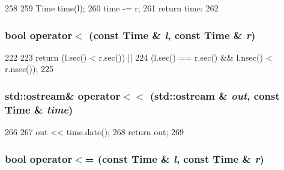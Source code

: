 \begin{DoxyCode}
258 {
259     Time time(l);
260     time -= r;
261     return time;
262 }
\end{DoxyCode}
\hypertarget{time_8hh_ad7758f80ee4f3845218fedfe23091532}{
\subsubsection[{operator$<$}]{\setlength{\rightskip}{0pt plus 5cm}bool operator$<$ (const {\bf Time} \& {\em l}, \/  const {\bf Time} \& {\em r})}}
\label{time_8hh_ad7758f80ee4f3845218fedfe23091532}



\begin{DoxyCode}
222 {
223     return (l.sec() < r.sec()) ||
224         (l.sec() == r.sec() && l.nsec() < r.nsec());
225 }
\end{DoxyCode}
\hypertarget{time_8hh_acd440d01c2aaa123d528091ba926ccd3}{
\subsubsection[{operator$<$$<$}]{\setlength{\rightskip}{0pt plus 5cm}std::ostream\& operator$<$$<$ (std::ostream \& {\em out}, \/  const {\bf Time} \& {\em time})}}
\label{time_8hh_acd440d01c2aaa123d528091ba926ccd3}



\begin{DoxyCode}
266 {
267     out << time.date();
268     return out;
269 }
\end{DoxyCode}
\hypertarget{time_8hh_aed91ae973ee20144a417fb8810e4dc73}{
\subsubsection[{operator$<$=}]{\setlength{\rightskip}{0pt plus 5cm}bool operator$<$= (const {\bf Time} \& {\em l}, \/  const {\bf Time} \& {\em r})}}
\label{time_8hh_aed91ae973ee20144a417fb8810e4dc73}



